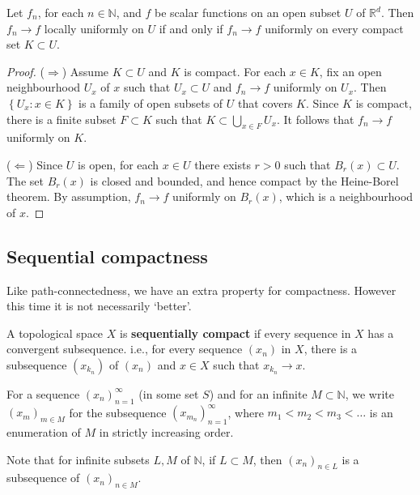 \documentclass[a4paper]{article}
\begin{document}
\begin{remark}
    Let $f_{n}$, for each $n \in \mathbb{N}$, and $f$ be scalar functions on an open subset $U$ of $\mathbb{R}^{d}$. Then $f_{n} \rightarrow f$ locally uniformly on $U$ if and only if $f_{n} \rightarrow f$ uniformly on every compact set $K \subset U$.
\end{remark}
\begin{proof}
($\Longrightarrow $) Assume $K \subset U$ and $K$ is compact. For each $x\in K$, fix an open neighbourhood $U_{x}$ of $x$ such that $U_{x} \subset U$ and $f_{n} \rightarrow f$ uniformly on $U_{x}$. Then $\left\{U_{x}: x \in K\right\}$ is a family of open subsets of $U$ that covers $K$. Since $K$ is compact, there is a finite subset $F \subset K$ such that $K \subset \bigcup_{x \in F} U_{x}$. It follows that $f_{n} \rightarrow f$ uniformly on $K$. 

($\Longleftarrow$) Since $U$ is open, for each $x \in U$ there exists $r>0$ such that $B_{r}(x) \subset U$. The set $B_{r}(x)$ is closed and bounded, and hence compact by the Heine-Borel theorem. By assumption, $f_{n} \rightarrow f$ uniformly on $B_{r}(x)$, which is a neighbourhood of $x$.
\end{proof}

\subsection{Sequential compactness}
Like path-connectedness, we have an extra property for compactness. However this time it is not necessarily `better'.
\begin{definition}
    A topological space $X$ is \textbf{sequentially compact} if every sequence in $X$ has a convergent subsequence. i.e., for every sequence $\left(x_{n}\right)$ in $X$, there is a subsequence $\left(x_{k_{n}}\right)$ of $\left(x_{n}\right)$ and $x \in X$ such that $x_{k_{n}} \rightarrow x$.
\end{definition}

For a sequence $\left(x_{n}\right)_{n=1}^{\infty}$ (in some set $S$) and for an infinite $M \subset \mathbb{N}$, we write $\left(x_{m}\right)_{m \in M}$ for the subsequence $\left(x_{m_{n}}\right)_{n=1}^{\infty}$, where $m_{1}<m_{2}<m_{3}<\ldots$ is an enumeration of $M$ in strictly increasing order.

Note that for infinite subsets $L, M$ of $\mathbb{N}$, if $L \subset M$, then $\left(x_{n}\right)_{n \in L}$ is a subsequence of $\left(x_{n}\right)_{n \in M}$.
\end{document}
